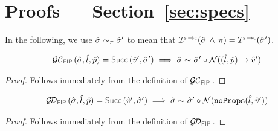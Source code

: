 

\newpage
\section{Proofs --- Section~\ref{sec:specs}}


\newcommand{\unificationfunction}{\textsc{Unification}}
\newcommand{\extendedunificationfunction}{\underline{\textsc{Unification}}}
\newcommand{\emptystate}{\emptyset}
\newcommand{\stateequiv}{\sim}
\newcommand{\stateequivrel}[3]{#1 \sim_{#3} #2}


In the following, we use $\stateequivrel{\sstate}{\sstate'}{\pc}$ to mean 
that $\interpret{\symbconc}{}(\sstate \, \wedge \, \pc) = \interpret{\symbconc}{}(\sstate')$. 

\begin{lemma}\label{lemma:getcell:fip}
$$
\begin{array}{l}
\GetCellV{\sstate, \sloc, \sexprp} = \success{\sexprv', \sstate'} 
    \implies 
        \stateequivrel{\sstate}{\sstate' \statecompose \normaliser((\sloc, \sexprp) \pointsto \sexprv')}{}
\end{array}
$$
\end{lemma}
\begin{proof}
Follows immediately from the definition of $\GetCellVFun$. 
\end{proof}

\begin{lemma}\label{lemma:getdomain:fip}
$$
\begin{array}{l}
\GetDomainV{\sstate, \sloc, \sexprp} = \success{\sexprv', \sstate'} 
    \implies 
        \stateequivrel{\sstate}{\sstate' \statecompose \normaliser(\emptyfields{\sloc}{\sexprv'})}{}
\end{array}
$$
\end{lemma}
\begin{proof}
Follows immediately from the definition of $\GetDomainVFun$. 
\end{proof}

